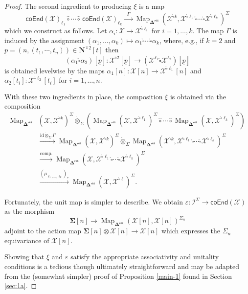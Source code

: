 \documentclass[11pt]{amsart}
\theoremstyle{definition}
\theoremstyle{remark}
\newcommand{\Map}{\operatorname{Map}}
\newcommand{\id}{\mathrm{id}}
\newcommand{\Cal}[1]{\mathcal{#1}}
\newcommand{\Ncirc}[1]{\mathbf{N}^{\hat{\circ}#1}}
\newcommand{\circhat}{\hat{\circ}}
\newcommand{\tensordot}{\dot{\otimes}}
\newcommand{\boxcirc}{\mathring{\square}}
\newcommand{\Isym}{\Cal{I}^{\Sigma}}
\newcommand{\bdel}{\mathbf{\Delta}}
\newcommand{\coend}[1]{\mathsf{coEnd}(\Cal{#1})}
\newcommand{\Dres}{\bdel^{\mathsf{res}}}
\begin{document}
\begin{proof}
    The second ingredient to producing $\xi$ is a map \begin{equation} \label{eq:def-Gamma}
        \coend{X}_{\ell_1} \circhat \cdots \circhat \, \coend{X}_{\ell_k} \xrightarrow{\;\;\Gamma\;\;} \Map_{\Dres} \left(\Cal{X}^{\boxcirc k}, \Cal{X}^{\boxcirc \ell_1} \boxcirc \cdots \boxcirc \Cal{X}^{\boxcirc \ell_k} \right)^{\Sigma}
    \end{equation}
    which we construct as follows. Let $\alpha_i\colon \Cal{X}\to \Cal{X}^{\boxcirc \ell_i}$ for $i=1,\dots, k$. The map $\Gamma$ is induced by the assignment $(\alpha_1,\dots,\alpha_k)\mapsto \alpha_1 \boxcirc \cdots \boxcirc \alpha_k$,  where, e.g.,  if $k=2$ and $\underline{p}=(n,(t_1,\cdots,t_n))\in \Ncirc{2}[t]$ then \[(\alpha_1\boxcirc \alpha_2)[\underline{p}] \colon \Cal{X}^{\boxcirc 2}[\underline{p}] \to (\Cal{X}^{\ell_1} \boxcirc \Cal{X}^{\ell_2})[\underline{p}]\] is obtained levelwise by the maps $\alpha_1[n] \colon \Cal{X}[n]\to \Cal{X}^{\boxcirc \ell_1}[n]$ and $\alpha_2[t_i]\colon \Cal{X}^{\boxcirc \ell_2}[t_i]$ for $i=1,\dots,n$.

   With these two ingredients in place, the composition $\xi$ is obtained via the composition \begin{align*} 
            \Map_{\Dres}&\left(\Cal{X},\Cal{X}^{\boxcirc k}\right)^{\Sigma} \tensordot_{\Sigma}\left( \Map_{\Dres}\left(\Cal{X},\Cal{X}^{\boxcirc \ell_1}\right)^{\Sigma}  \circhat \cdots \circhat \Map_{\Dres}\left(\Cal{X},\Cal{X}^{\boxcirc \ell_k}\right)^{\Sigma} \right)
            \\
            &\xrightarrow{\id \tensordot_{\Sigma}  \Gamma}  
            \Map_{\Dres} \left(\Cal{X},\Cal{X}^{\boxcirc k}\right)^{\Sigma} \tensordot_{\Sigma}  \Map_{\Dres} \left(\Cal{X}^{\boxcirc k},  \Cal{X}^{\boxcirc \ell_1} \boxcirc \cdots \boxcirc \Cal{X}^{\boxcirc \ell_k} \right)^{\Sigma} 
            \\
            &\xrightarrow{\text{comp.}} 
            \Map_{\Dres} \left(\Cal{X}, \Cal{X}^{\boxcirc \ell_1} \boxcirc \cdots \boxcirc \Cal{X}^{\boxcirc \ell_k}\right)^{\Sigma} \\
            &\xrightarrow{(\mu_{\ell_1,\dots,\ell_k})_*}
            \Map_{\Dres}\left(\Cal{X},\Cal{X}^{\boxcirc \ell}\right)^{\Sigma}.
        \end{align*}
    
    Fortunately, the unit map is simpler to describe. We obtain $\varepsilon\colon \Isym\to \coend{X}$ as the morphism \[\mathbf{\Sigma}[n]\to \Map_{\Dres}(\Cal{X}[n], \Cal{X}[n])^{\Sigma_n}\]  adjoint to the action map $\mathbf{\Sigma}[n] \otimes \Cal{X}[n] \to \Cal{X}[n]$ which expresses the $\Sigma_n$ equivariance of $\Cal{X}[n]$. 
    
    Showing that $\xi$ and $\varepsilon$ satisfy the appropriate associativity and unitality conditions is a tedious though ultimately straightforward and may be adapted from the (somewhat simpler) proof of Proposition \ref{main-1} found in Section \ref{sec:1a}. 
\end{proof}
\end{document}
